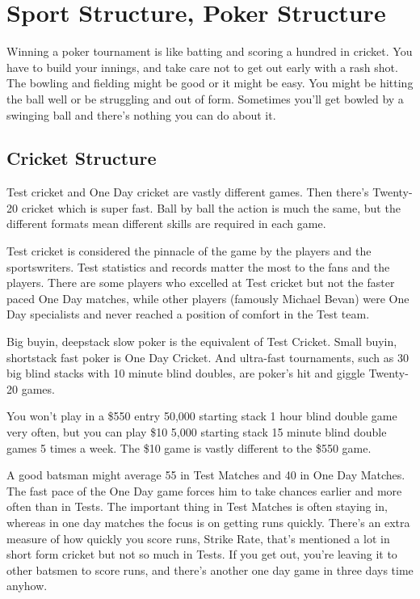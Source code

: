 \chapter{Sport Structure, Poker Structure}


Winning a poker tournament is like batting and scoring a hundred in cricket.
You have to build your innings, and take care not to get out early
with a rash shot. The bowling and fielding might be good or it might
be easy. You might be hitting the ball well or be struggling and out
of form. Sometimes you'll get bowled by a swinging ball and
there's nothing you can do about it.

\section{Cricket Structure}

Test cricket and One Day cricket are vastly different games. Then
there's Twenty-20 cricket which is super fast. Ball by ball the
action is much the same, but the different formats mean
different skills are required in each game.

Test cricket is considered the pinnacle of the game by the players
and the sportswriters. Test statistics and records
matter the most to the fans and the players. There are some players who excelled
at Test cricket but not the faster paced One Day matches, while
other players (famously Michael Bevan) were One Day
specialists and never reached a position of comfort in the Test team.

Big buyin, deepstack slow poker is the equivalent of Test Cricket.
Small buyin, shortstack fast poker is One Day Cricket.
And ultra-fast tournaments, such as 30 big blind stacks with 10 minute
blind doubles, are poker's hit and giggle Twenty-20 games.

You won't play in a \$550 entry 50,000 starting stack 1 hour blind double
game very often, but you can play \$10 5,000 starting stack 15 minute
blind double games 5 times a week. The \$10 game is vastly
different to the \$550 game.

A good batsman might average 55 in Test Matches and 40 in One Day
Matches. The fast pace of the One Day game forces him to take
chances earlier and more often than in Tests. The important thing in
Test Matches is often staying in, whereas in one day matches
the focus is on getting runs quickly. There's an extra
measure of how quickly you score runs, Strike Rate, that's mentioned
a lot in short form cricket but not so much in Tests. If you get out,
you're leaving it to other batsmen to score runs, and there's another
one day game in three days time anyhow.

